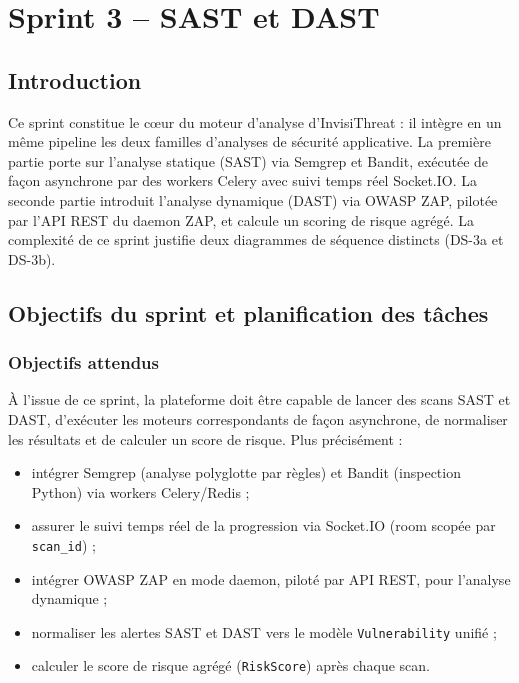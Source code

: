 \chapter{Sprint 3 -- SAST et DAST}

\section{Introduction}
Ce sprint constitue le cœur du moteur d'analyse d'InvisiThreat : il intègre en un même pipeline les deux familles d'analyses de sécurité applicative. La première partie porte sur l'analyse statique (SAST) via Semgrep et Bandit, exécutée de façon asynchrone par des workers Celery avec suivi temps réel Socket.IO. La seconde partie introduit l'analyse dynamique (DAST) via OWASP ZAP, pilotée par l'API REST du daemon ZAP, et calcule un scoring de risque agrégé. La complexité de ce sprint justifie deux diagrammes de séquence distincts (DS-3a et DS-3b).

\section{Objectifs du sprint et planification des tâches}

\subsection{Objectifs attendus}
À l'issue de ce sprint, la plateforme doit être capable de lancer des scans SAST et DAST, d'exécuter les moteurs correspondants de façon asynchrone, de normaliser les résultats et de calculer un score de risque. Plus précisément :
\begin{itemize}
  \item intégrer Semgrep (analyse polyglotte par règles) et Bandit (inspection Python) via workers Celery/Redis ;
  \item assurer le suivi temps réel de la progression via Socket.IO (room scopée par \texttt{scan\_id}) ;
  \item intégrer OWASP ZAP en mode daemon, piloté par API REST, pour l'analyse dynamique ;
  \item normaliser les alertes SAST et DAST vers le modèle \texttt{Vulnerability} unifié ;
  \item calculer le score de risque agrégé (\texttt{RiskScore}) après chaque scan.
\end{itemize}

